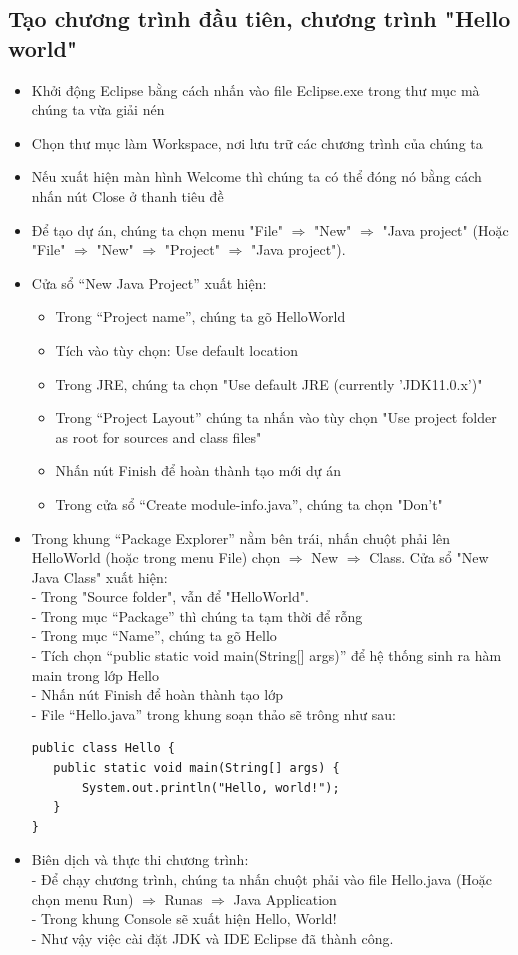 \subsection{Tạo chương trình đầu tiên, chương trình "Hello world"}
\begin{itemize}
\item Khởi động Eclipse bằng cách nhấn vào file Eclipse.exe trong thư mục mà chúng ta vừa giải nén
\item Chọn thư mục làm Workspace, nơi lưu trữ các chương trình của chúng ta
\item Nếu xuất hiện màn hình Welcome thì chúng ta có thể đóng nó bằng cách nhấn nút Close ở thanh tiêu đề
\item Để tạo dự án, chúng ta chọn menu "File" $\Rightarrow$ "New" $\Rightarrow$ "Java project" (Hoặc "File" $\Rightarrow$ "New" $\Rightarrow$ "Project" $\Rightarrow$ "Java project").
\item Cửa sổ “New Java Project” xuất hiện:
\begin{itemize}
\item Trong “Project name”, chúng ta gõ HelloWorld
\item Tích vào tùy chọn: Use default location
\item Trong JRE, chúng ta chọn "Use default JRE (currently 'JDK11.0.x')"
\item Trong “Project Layout” chúng ta nhấn vào tùy chọn "Use project folder as root for sources and class files"
\item Nhấn nút Finish để hoàn thành tạo mới dự án
\item Trong cửa sổ “Create module-info.java”, chúng ta chọn "Don’t"
\end{itemize}
\item Trong khung “Package Explorer” nằm bên trái, nhấn chuột phải lên HelloWorld (hoặc trong menu File) chọn $\Rightarrow$ New $\Rightarrow$ Class. Cửa sổ "New Java Class" xuất hiện:\\
- Trong "Source folder", vẫn để "HelloWorld".\\
- Trong mục “Package” thì chúng ta tạm thời để rỗng\\
- Trong mục “Name”, chúng ta gõ Hello\\
- Tích chọn “public static void main(String[] args)” để hệ thống sinh ra hàm main trong lớp Hello\\
- Nhấn nút Finish để hoàn thành tạo lớp\\
- File “Hello.java” trong khung soạn thảo sẽ trông như sau:

\begin{verbatim}
public class Hello {
   public static void main(String[] args) {
       System.out.println("Hello, world!");
   }
}
\end{verbatim}

\item Biên dịch và thực thi chương trình:\\
- Để chạy chương trình, chúng ta nhấn chuột phải vào file Hello.java (Hoặc chọn menu Run) $\Rightarrow$ Runas $\Rightarrow$ Java Application \\
- Trong khung Console sẽ xuất hiện Hello, World!\\
- Như vậy việc cài đặt JDK và IDE Eclipse đã thành công.
\end{itemize}
